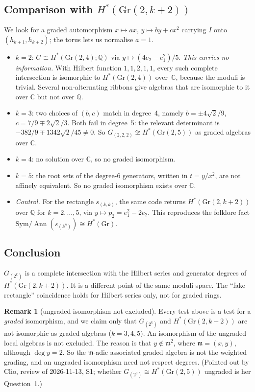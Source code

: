 \documentclass[11pt]{amsart}
\newcommand{\Sym}{\mathrm{Sym}}
\newcommand{\Ann}{\operatorname{Ann}}
\newcommand{\Gr}{\mathrm{Gr}}
\newcommand{\QQ}{\mathbb{Q}}
\newcommand{\CC}{\mathbb{C}}
\theoremstyle{plain}
\theoremstyle{definition}
\newtheorem{remark}[theorem]{Remark}
\begin{document}
\subsection*{Comparison with $H^*(\Gr(2,k+2))$}
We look for a graded automorphism $x\mapsto ax$, $y\mapsto by+cx^2$ carrying $I$ onto $(h_{k+1},h_{k+2})$; the torus lets us normalise $a=1$.
\begin{itemize}[leftmargin=1.2em,itemsep=1pt]
\item $k=2$: $G\cong H^*(\Gr(2,4);\QQ)$ via $y\mapsto(4e_2-e_1^2)/5$. \emph{This carries no information.} With Hilbert function $1,1,2,1,1$, every such complete intersection is isomorphic to $H^*(\Gr(2,4))$ over~$\CC$, because the moduli is trivial. Several non-alternating ribbons give algebras that are isomorphic to it over $\CC$ but not over $\QQ$.
\item $k=3$: two choices of $(b,c)$ match in degree~4, namely $b=\pm4\sqrt2/9$, $c=7/9\mp2\sqrt2/3$. Both fail in degree~5: the relevant determinant is $-382/9\mp1342\sqrt2/45\ne0$. So $G_{(2,2,2)}\not\cong H^*(\Gr(2,5))$ as graded algebras over $\CC$.
\item $k=4$: no solution over $\CC$, so no graded isomorphism.
\item $k=5$: the root sets of the degree-$6$ generators, written in $t=y/x^2$, are not affinely equivalent. So no graded isomorphism exists over $\CC$.
\item \emph{Control.} For the rectangle $s_{(k,k)}$, the same code returns $H^*(\Gr(2,k+2))$ over $\QQ$ for $k=2,\dots,5$, via $y\mapsto p_2=e_1^2-2e_2$. This reproduces the folklore fact $\Sym/\Ann(s_{(k^n)})\cong H^*(\Gr)$.
\end{itemize}

\subsection*{Conclusion}
$G_{(2^k)}$ is a complete intersection with the Hilbert series and generator degrees of $H^*(\Gr(2,k+2))$. It is a different point of the same moduli space. The ``fake rectangle'' coincidence holds for Hilbert series only, not for graded rings.

\begin{remark}[ungraded isomorphism not excluded]\label{rem:ungraded}
Every test above is a test for a \emph{graded} isomorphism, and we claim only that $G_{(2^k)}$ and $H^*(\Gr(2,k+2))$ are not isomorphic as graded algebras ($k=3,4,5$). An isomorphism of the ungraded local algebras is not excluded. The reason is that $y\notin\mathfrak m^2$, where $\mathfrak m=(x,y)$, although $\deg y=2$. So the $\mathfrak m$-adic associated graded algebra is not the weighted grading, and an ungraded isomorphism need not respect degrees. (Pointed out by Clio, review of 2026-11-13, S1; whether $G_{(2^3)}\cong H^*(\Gr(2,5))$ ungraded is her Question~1.)
\end{remark}
\end{document}
